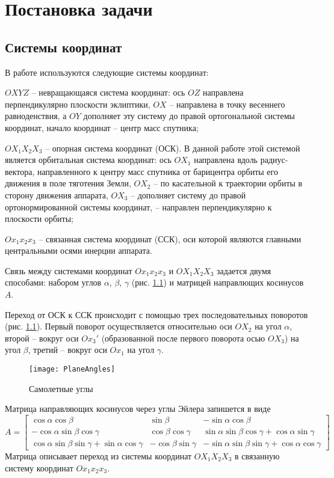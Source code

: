 \chapter{Постановка задачи}
\section{Системы координат}
\noindent\indent В работе используются следующие системы координат:\par
\noindent $OXYZ$ -- невращающаяся система координат: ось $OZ$ направлена
перпендикулярно плоскости эклиптики, $OX$ -- направлена в точку весеннего
равноденствия, а $OY$ дополняет эту систему до правой ортогональной системы
координат, начало координат -- центр масс спутника;\par
\noindent $OX_1X_2X_3$ -- опорная система координат (ОСК). В данной работе
этой системой является орбитальная система координат: ось $OX_1$ направлена вдоль
радиус-вектора, направленного к центру масс спутника от барицентра орбиты его движения
 в поле тяготения Земли, $OX_2$ -- по касательной к траектории орбиты в сторону
движения аппарата, $OX_3$ -- дополняет систему до правой ортонормированной системы
координат, -- направлен перпендикулярно к плоскости орбиты;\par
\noindent $Ox_1x_2x_3$ -- связанная система координат (ССК), оси которой являются
главными центральными осями инерции аппарата.\par
    Связь между системами координат $Ox_1x_2x_3$ и $OX_1X_2X_3$ задается двумя
способами: набором углов $\alpha$, $\beta$, $\gamma$ (рис. \ref{fig:KrilovAngles})
и матрицей направлющих косинусов $A$.\par
    Переход от ОСК к ССК происходит с помощью трех последовательных поворотов
(рис. \ref{fig:KrilovAngles}). Первый поворот осуществляется относительно оси $OX_2$
на угол $\alpha$, второй -- вокруг оси $Ox_3'$ (образованной после первого поворота
осью $OX_3$) на угол $\beta$, третий -- вокруг оси $Ox_1$ на угол $\gamma$.
\begin{figure}[h]
  \centering
  \texttt{[image: PlaneAngles]}
  \caption{Самолетные углы}
  \label{fig:KrilovAngles}
\end{figure}\par
    Матрица направляющих косинусов через углы Эйлера запишется в виде
\begin{equation}
    A = \begin{bmatrix}
        \cos\alpha\cos\beta & \sin\beta & -\sin\alpha\cos\beta\\
        -\cos\alpha\sin\beta\cos\gamma & \cos\beta\cos\gamma & \sin\alpha\sin\beta\cos\gamma + \cos\alpha\sin\gamma \\
        \cos\alpha\sin\beta\sin\gamma + \sin\alpha\cos\gamma & -\cos\beta\sin\gamma & -\sin\alpha\sin\beta\sin\gamma + \cos\alpha\cos\gamma
    \end{bmatrix}
\end{equation}
Матрица описывает переход из системы координат $OX_1X_2X_3$ в связанную систему
координат $Ox_1x_2x_3$.
